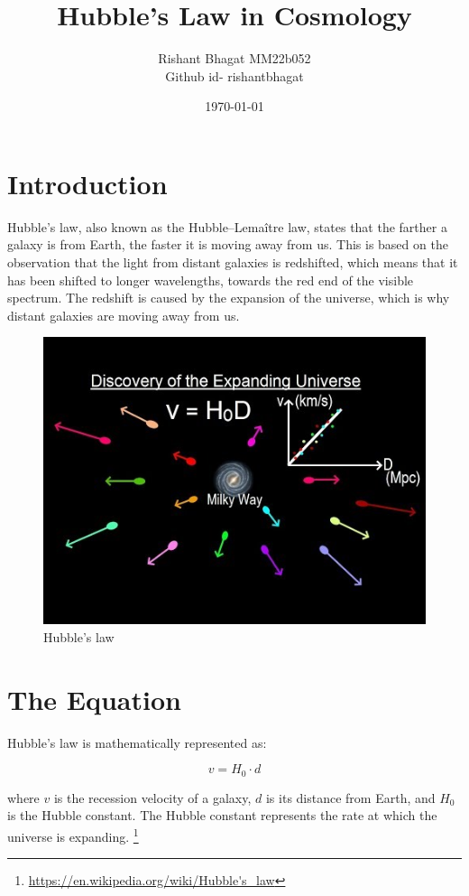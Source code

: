 \documentclass{article}
\begin{document}
\title{Hubble's Law in Cosmology}
\author{Rishant Bhagat MM22b052 \\ Github id- rishantbhagat}

\date{\today}

\maketitle

\section{Introduction}
Hubble's law, also known as the Hubble–Lemaître law, states that the farther a galaxy is from Earth, the faster it is moving away from us. This is based on the observation that the light from distant galaxies is redshifted, which means that it has been shifted to longer wavelengths, towards the red end of the visible spectrum. The redshift is caused by the expansion of the universe, which is why distant galaxies are moving away from us.
\begin{figure}[h]
\begin{center}

\includegraphics[width=0.5 \textwidth]{hubble.jpg}
\caption{Hubble's law}
\end{center}
\end{figure}
\section{The Equation}
Hubble's law is mathematically represented as:

\begin{equation}
v = H_0 \cdot d
\end{equation}

where $v$ is the recession velocity of a galaxy, $d$ is its distance from Earth, and $H_0$ is the Hubble constant. The Hubble constant represents the rate at which the universe is expanding.
\footnote{\url{https://en.wikipedia.org/wiki/Hubble's_law}}
\end{document}
